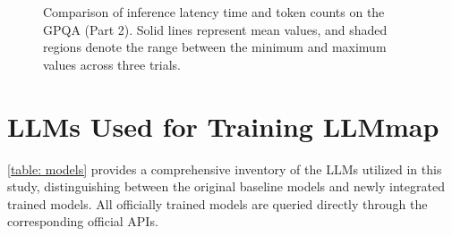 \documentclass[letterpaper,twocolumn,10pt]{article}
\begin{document}
\begin{figure}[t]
    \caption{Comparison of inference latency time and token counts on the GPQA (Part 2). Solid lines represent mean values, and shaded regions denote the range between the minimum and maximum values across three trials.}
    \label{fig:gpqa_results_part2}
\end{figure}

\section{LLMs Used for Training LLMmap}
\label{appendix:llmmap_model}

\autoref{table: models} provides a comprehensive inventory of the LLMs utilized in this study, distinguishing between the original baseline models and newly integrated trained models.
All officially trained models are queried directly through the corresponding official APIs.

\begin{table}[ht!]
\centering
\caption{Controlled validation scenarios. Each scenario contains $N{=}100$ samples.}
\label{tab:validation_scenarios}
\end{table}
\end{document}
